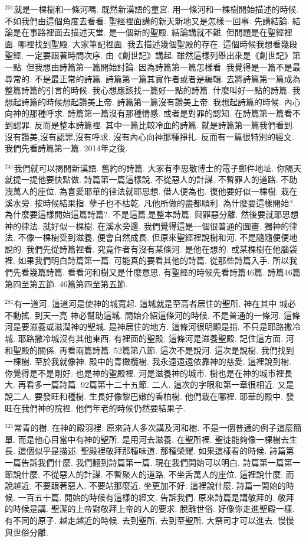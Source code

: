\documentclass{book}
\begin{document}
$^{201}$就是一棵樹和一條河嗎.
既然新漢語的童宮.
用一條河和一棵樹開始描述的時候.
不如我們由這個角度去看看.
聖經裡面講的新天新地又是怎樣一回事.
先講結論.
結論是在事路裡面去描述天堂.
是一個新的聖殿.
結論講就不難.
但問題是在聖經裡面.
哪裡找到聖殿.
大家筆記裡面.
我去描述幾個聖殿的存在.
這個時候我想看幾段聖經.
一定要跟著時間次序.
由《創世記》講起.
雖然這樣列舉出來是《創世記》第一點.
但我想由詩篇第一篇開始討論.
因為詩篇第一篇怎樣看.
我覺得是一篇不是最尋常的.
不是最正常的詩篇.
詩篇第一篇其實作者或者是編輯.
去將詩篇第一篇成為整篇詩篇的引言的時候.
我心想應該找一篇好一點的詩篇.
什麼叫好一點的詩篇.
我想起詩篇的時候想起讚美上帝.
詩篇第一篇沒有讚美上帝.
我想起詩篇的時候.
內心向神的那種呼求.
詩篇第一篇沒有那種情感.
或者是對罪的認知.
在詩篇第一篇看不到認罪.
反而是整本詩篇裡.
其中一篇比較冷血的詩篇.
就是詩篇第一篇我們看到.
沒有讚美,沒有認罪,沒有呼求.
沒有內心向神那種掙扎.
反而有一篇很特別的經文.
我們先看詩篇第一篇.
2014年之後.

$^{241}$我們就可以揭開新漢語.
舊約的詩篇.
大家有李思敬博士的電子郵件地址.
你隔天就提一提他要快點做.
詩篇第一篇這樣說.
不從惡人的計謀.
不暫罪人的道路.
不助洩萬人的座位.
為喜愛耶華的律法就耶思想.
借人便為也.
復他要好似一棵樹.
栽在溪水旁.
按時候結果指.
孽子也不枯乾.
凡他所做的盡都順利.
為什麼要這樣開始?.
為什麼要這樣開始這篇詩篇?.
不是這篇,是整本詩篇.
與罪惡分離.
然後要就耶思想神的律法.
就好似一棵樹.
在溪水旁邊.
我們覺得這是一個很普通的圖畫.
獨神的律法.
不像一棵樹受到滋養.
便會自然成長.
但原來聖經裡說樹和河.
不是隨隨便便地說的.
我們先從詩篇裡看.
究竟作者有沒有某條河.
是他在想的.
或某棵樹在他腦袋裡.
如果我們明白詩篇第一篇.
可能真的要看其他的詩篇.
從那些詩篇入手.
所以我們先看幾篇詩篇.
看看河和樹又是什麼意思.
有聖經的時候先看詩篇46篇.
詩篇46篇第四至第五節.
46篇第四至第五節.

$^{281}$有一道河.
這道河是使神的城寬起.
這城就是至高者居住的聖所.
神在其中 城必不動搖.
到天一亮 神必幫助這城.
開始介紹這條河的時候.
不是普通的一條河.
這條河是要滋養或滋潤神的聖城.
是神居住的地方.
這條河很明顯是指.
不只是耶路撒冷城.
耶路撒冷城沒有其他東西.
有裡面的聖殿.
這條河是滋養聖殿.
記住這方面.
河和聖殿的關係.
再看兩篇詩篇.
52篇第八節.
這次不是說河.
這次是說樹.
我們找到一棵樹.
至於我就像神.
殿中的青橄欖樹.
我永遠遠遠依靠神的慈愛.
這裡說到樹.
你覺得是不是剛好.
也是神的聖殿裡.
河是滋養神的城市.
樹也是在神的城市裡長大.
再看多一篇詩篇.
92篇第十二十五節.
二人.
這次的字眼和第一章很相近.
又是說二人.
要發旺和種樹.
生長好像黎巴嫩的香柏樹.
他們栽在哪裡.
耶華的殿中.
發旺在我們神的院裡.
他們年老的時候仍然要結果子.

$^{321}$常青的樹.
在神的殿羽裡.
原來詩人多次講及河和樹.
不是一個普通的例子這麼簡單.
而是他心目當中有神的聖所.
是用河去滋養.
在聖所裡.
聖徒能夠像一棵樹去生長.
這個似乎是描述.
聖殿裡敬拜那種味道.
那種榮耀.
如果這樣看的時候.
詩篇第一篇告訴我們什麼.
我們翻到詩篇第一篇.
現在我們開始可以明白.
詩篇第一篇第一節說什麼.
不從惡人的計謀.
不暫聚人的道路.
不坐舌萬人的座位.
這裡說什麼.
而說越近.
不要跟著惡人.
不要站那麼近.
坐更加不好.
這裡說什麼.
詩篇一開始的時候.
一百五十篇.
開始的時候有這樣的經文.
告訴我們.
原來詩篇是講敬拜的.
敬拜的時候是講.
聖潔的上帝對敬拜上帝的人的要求.
脫離世俗.
好像你走進聖殿一樣.
有不同的原子.
越走越近的時候.
去到聖所.
去到至聖所.
大祭司才可以進去.
慢慢與世俗分離.
\end{document}
